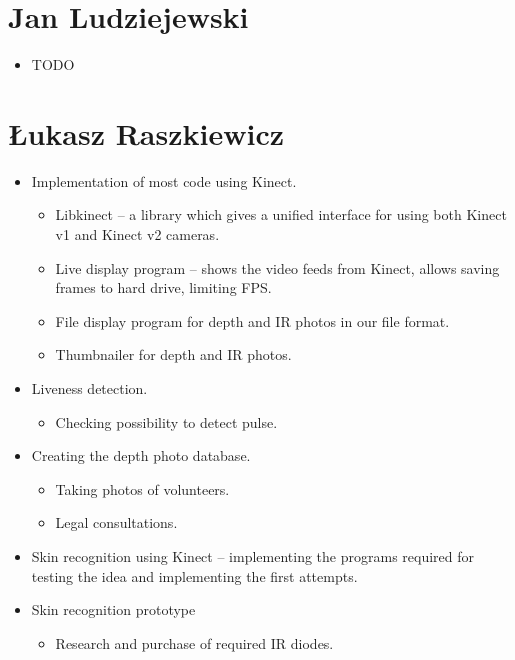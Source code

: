     \section{Jan Ludziejewski}
        \begin{itemize}
            \item TODO
        \end{itemize}

    \section{Łukasz Raszkiewicz}
        \begin{itemize}
            \item Implementation of most code using Kinect.
            \begin{itemize}
                \item Libkinect -- a library which gives a unified interface for
                using both Kinect v1 and Kinect v2 cameras.
                \item Live display program -- shows the video feeds from Kinect,
                allows saving frames to hard drive, limiting FPS.
                \item File display program for depth and IR photos in our file format.
                \item Thumbnailer for depth and IR photos.
            \end{itemize}
            \item Liveness detection.
            \begin{itemize}
                \item Checking possibility to detect pulse.
            \end{itemize} 
            \item Creating the depth photo database.
            \begin{itemize}
                \item Taking photos of volunteers.
                \item Legal consultations.
            \end{itemize}
            \item Skin recognition using Kinect -- implementing the programs required
            for testing the idea and implementing the first attempts.
            \item Skin recognition prototype
            \begin{itemize}
                \item Research and purchase of required IR diodes.

\end{itemize}
\end{itemize}
